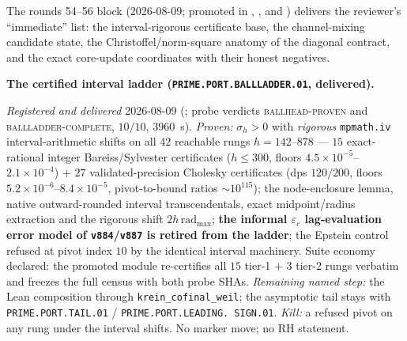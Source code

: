 \par\smallskip\noindent The rounds 54--56 block (2026-08-09;
promoted in ,
,
 and
) delivers the reviewer's
``immediate'' list: the interval-rigorous certificate base, the
channel-mixing candidate state, the Christoffel/norm-square
anatomy of the diagonal contract, and the exact core-update
coordinates with their honest negatives.


\par\smallskip\noindent\textbf{The certified interval ladder
(\texttt{PRIME.PORT.\allowbreak BALLLADDER.01}, delivered).}
{\sloppy
\emph{Registered and delivered} 2026-08-09
(; probe verdicts
\textsc{ballhead-proven} and \textsc{ballladder-complete},
$10/10$, $3960$~s).  \emph{Proven:} $\sigma_h > 0$ with
\emph{rigorous} \texttt{mpmath.iv} interval-arithmetic shifts on
all $42$ reachable rungs $h = 142$--$878$ --- $15$
exact-rational integer Bareiss/Sylvester certificates ($h \le
300$, floors $4.5\times10^{-5}$--$2.1\times10^{-4}$) $+$ $27$
validated-precision Cholesky certificates (dps $120/200$, floors
$5.2\times10^{-6}$--$8.4\times10^{-5}$, pivot-to-bound ratios
${\sim}10^{115}$); the node-enclosure lemma, native
outward-rounded interval transcendentals, exact midpoint/radius
extraction and the rigorous shift $2h\,\mathrm{rad}_{\max}$;
\textbf{the informal $\varepsilon_c$ lag-evaluation error model
of \texttt{v884}/\texttt{v887} is retired from the ladder}; the
Epstein control refused at pivot index $10$ by the identical
interval machinery.  Suite economy declared: the promoted module
re-certifies all $15$ tier-1 $+$ $3$ tier-2 rungs verbatim and
freezes the full census with both probe SHAs.  \emph{Remaining
named step:} the Lean composition through
\texttt{krein\_cofinal\_weil}; the asymptotic tail stays with
\texttt{PRIME.PORT.TAIL.01} / \texttt{PRIME.PORT.LEADING.%
SIGN.01}.  \emph{Kill:} a refused pivot on any rung under the
interval shifts.  No marker move; no RH statement.\par}


